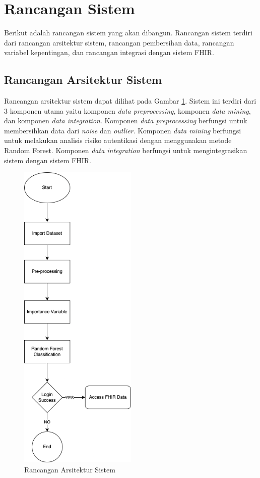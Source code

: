 \section{Rancangan Sistem}
Berikut adalah rancangan sistem yang akan dibangun. Rancangan sistem terdiri dari rancangan arsitektur sistem, rancangan pembersihan data, rancangan variabel kepentingan, dan rancangan integrasi dengan sistem FHIR.

\subsection{Rancangan Arsitektur Sistem}
Rancangan arsitektur sistem dapat dilihat pada Gambar \ref{fig:arsitektur-sistem}. Sistem ini terdiri dari 3 komponen utama yaitu komponen \textit{data preprocessing}, komponen \textit{data mining}, dan komponen \textit{data integration}. Komponen \textit{data preprocessing} berfungsi untuk membersihkan data dari \textit{noise} dan \textit{outlier}. Komponen \textit{data mining} berfungsi untuk melakukan analisis risiko autentikasi dengan menggunakan metode Random Forest. Komponen \textit{data integration} berfungsi untuk mengintegrasikan sistem dengan sistem FHIR.

\begin{figure}[H]
    \centering
    \includegraphics[width=0.5\textwidth]{contents/chapter-4/diagram-khusus.png}
    \caption{Rancangan Arsitektur Sistem}
    \label{fig:arsitektur-sistem}
\end{figure}

